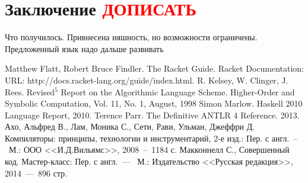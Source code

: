 \documentclass[12pt,a4paper,oneside]{extarticle}
\begin{document}
\clearpage

\section{Заключение \textcolor{red}{ДОПИСАТЬ}}
    Что получилось. Привнесена няшность, но возможности ограничены. Предложенный язык надо дальше развивать



\clearpage


\begin{thebibliography}{0}
     Matthew Flatt, Robert Bruce Findler. The Racket Guide. Racket Documentation: URL: http://docs.racket-lang.org/guide/index.html.
     R. Kelsey, W. Clinger, J. Rees. Revised$^5$ Report on the Algorithmic Language Scheme. Higher-Order and Symbolic Computation, Vol. 11, No. 1, August, 1998
     Simon Marlow. Haskell 2010 Language Report, 2010.
     Terence Parr. The Definitive ANTLR 4 Reference. 2013.
     Ахо, Альфред В., Лам, Моника С., Сети, Рави, Ульман, Джеффри Д. Компиляторы: принципы, технологии и инструментарий, 2-е изд.: Пер. с англ.~--~М.: ООО <<И.Д.Вильямс>>, 2008~--~1184 с.
     Макконнелл С., Совершенный код. Мастер-класс: Пер. с англ.~---~ М.: Издательство <<Русская редакция>>, 2014~---~896 стр.        
\end{thebibliography}
\end{document}
